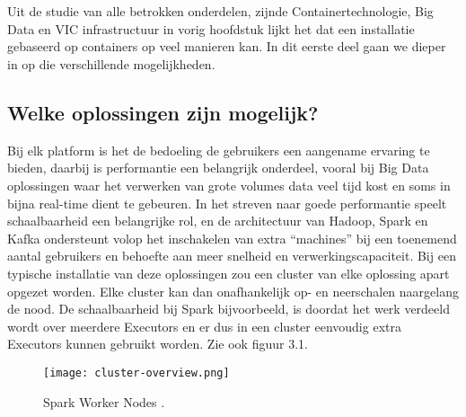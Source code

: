 
\chapter{}%
\label{ch:methodologie}




Uit de studie van alle betrokken onderdelen, zijnde Containertechnologie, Big Data en VIC infrastructuur in vorig hoofdstuk lijkt het dat een installatie gebaseerd op containers op veel manieren kan. In dit eerste deel gaan we dieper in op die verschillende mogelijkheden.

\section{Welke oplossingen zijn mogelijk?}

Bij elk platform is het de bedoeling de gebruikers een aangename ervaring te bieden, daarbij is performantie een belangrijk onderdeel, vooral bij Big Data oplossingen waar het verwerken van grote volumes data veel tijd kost en soms in bijna real-time dient te gebeuren.
In het streven naar goede performantie speelt schaalbaarheid een belangrijke rol, en de architectuur van Hadoop, Spark en Kafka ondersteunt volop het inschakelen van extra ``machines'' bij een toenemend aantal gebruikers en behoefte aan meer snelheid en verwerkingscapaciteit.
Bij een typische installatie van deze oplossingen zou een cluster van elke oplossing apart opgezet worden. Elke cluster kan dan onafhankelijk op- en neerschalen naargelang de nood.
\newline
De schaalbaarheid bij Spark bijvoorbeeld, is doordat het werk verdeeld wordt over meerdere Executors en er dus in een cluster eenvoudig extra Executors kunnen gebruikt worden. Zie ook figuur 3.1.
\newline
\begin{figure}[H]
    \texttt{[image: cluster-overview.png]}
    \caption{Spark Worker Nodes \autocite{Spark2023e}.}
\end{figure}

